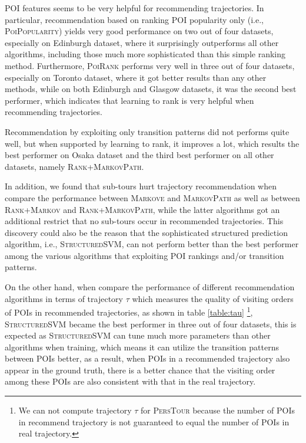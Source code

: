 POI features seems to be very helpful for recommending trajectories.
In particular, recommendation based on ranking POI popularity only 
(i.e., \textsc{PoiPopularity}) yields very good performance on two out of four datasets, 
especially on Edinburgh dataset, where it surprisingly outperforms all 
other algorithms, including those much more sophisticated than this simple ranking method.
%
Furthermore, \textsc{PoiRank} performs very well in three out of four datasets, 
especially on Toronto dataset, where it got better results than any other methods, 
while on both Edinburgh and Glasgow datasets, it was the second best performer, 
which indicates that learning to rank is very helpful when recommending trajectories.

Recommendation by exploiting only transition patterns did not performs quite well,
but when supported by learning to rank, it improves a lot, which results the best performer on Osaka dataset and
the third best performer on all other datasets, namely \textsc{Rank+MarkovPath}.

In addition, we found that sub-tours hurt trajectory recommendation when compare the performance between
\textsc{Markove} and \textsc{MarkovPath} as well as between \textsc{Rank+Markov} and 
\textsc{Rank+MarkovPath}, while the latter algorithms got an additional restrict that no sub-tours 
occur in recommended trajectories.
% 
This discovery could also be the reason that the sophisticated structured prediction algorithm, 
i.e., \textsc{StructuredSVM}, can not perform better than the best performer among the various algorithms
that exploiting POI rankings and/or transition patterns.


On the other hand, when compare the performance of different recommendation algorithms in terms of trajectory $\tau$
which measures the quality of visiting orders of POIs in recommended trajectories,
as shown in table \ref{table:tau}
\footnote{We can not compute trajectory $\tau$ for \textsc{PersTour} because the number of POIs in recommend trajectory 
is not guaranteed to equal the number of POIs in real trajectory.},
\textsc{StructuredSVM} became the best performer in three out of four datasets,
this is expected as \textsc{StructuredSVM} can tune much more parameters than other algorithms when training,
which means it can utilize the transition patterns between POIs better,
as a result, when POIs in a recommended trajectory also appear in the ground truth, 
there is a better chance that the visiting order among these POIs are also consistent with 
that in the real trajectory.

